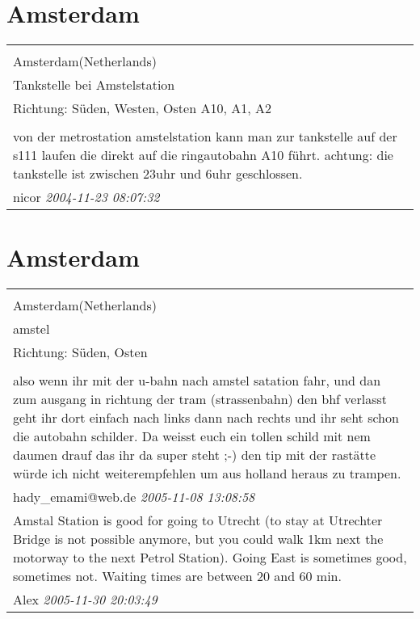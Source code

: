 \documentclass[a4paper,12pt]{article}
\begin{document}
\section{Amsterdam}
\begin{tabular}{|p{13cm}|}
\hline\\
Amsterdam(Netherlands)\\
Tankstelle bei Amstelstation\\
Richtung: Süden, Westen, Osten A10, A1, A2 \\
\hline\\
von der metrostation amstelstation kann man zur tankstelle auf der s111 laufen die direkt auf die ringautobahn A10 führt. achtung: die tankstelle ist zwischen 23uhr und 6uhr geschlossen. \\
nicor \textit{ 2004-11-23 08:07:32 }\\\hline
\end{tabular}


\section{Amsterdam}
\begin{tabular}{|p{13cm}|}
\hline\\
Amsterdam(Netherlands)\\
amstel\\
Richtung: Süden, Osten \\
\hline\\
also wenn ihr mit der u-bahn nach amstel satation fahr, und dan zum ausgang in richtung der tram (strassenbahn) den bhf verlasst geht ihr dort einfach nach links dann nach rechts und ihr seht schon die autobahn schilder. Da weisst euch ein tollen schild mit nem daumen drauf das ihr da super steht ;-) den tip mit der rastätte würde ich nicht weiterempfehlen um aus holland heraus zu trampen. \\
hady\_emami@web.de \textit{ 2005-11-08 13:08:58 }\\\hline Amstal Station is good for going to Utrecht (to stay at Utrechter Bridge is not possible anymore, but you could walk 1km next the motorway to the next Petrol Station). Going East is sometimes good, sometimes not. Waiting times are between 20 and 60 min. \\
Alex \textit{ 2005-11-30 20:03:49 }\\\hline
\end{tabular}
\end{document}
